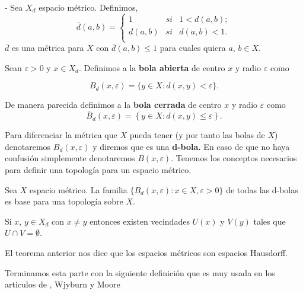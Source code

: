 \begin{ej}\label{ejem:metrica-acotada}
- Sea $X_{d}$ espacio métrico. Definimos,
$$\bar{d}(a,b)=\left\{
\begin{array}{lcc}
1 & si & 1 < d(a,b);   \\
d(a,b) & si & d(a,b)<1. \\
\end{array}
\right.
$$
$\bar{d}$ es una métrica para $X$ con $\bar{d}(a,b)\leq 1$ para cuales quiera $a$, $b \in X.$ 
\end{ej}

\label{def:top-espacios-metricos}
\begin{df}
Sean $\varepsilon > 0$ y $x\in X_d$. Definimos a la \textbf{bola abierta} de centro $x$ y radio $\varepsilon$  como

$$B_{d}(x,\varepsilon)=\{ y \in X: d(x,y)< \varepsilon \}.$$

De manera parecida definimos a la \textbf{bola cerrada} de centro $x$ y radio $\varepsilon$  como
$$\overline{B}_{d}(x,\varepsilon)=\left\lbrace y \in X: d(x,y)\leq \varepsilon \right\rbrace.$$
\end{df}

Para diferenciar la métrica que $X$ pueda tener (y por tanto las bolas de $X$) denotaremos $B_{d}(x,\varepsilon)$ y diremos que es una \textbf{d-bola.} En caso de que no haya confusión simplemente denotaremos $B(x,\varepsilon)$. Tenemos los conceptos necesarios para definir una topología para un espacio métrico.

\begin{pr}\label{prp:bolas-bse}
Sea $X$ espacio métrico. La familia $\lbrace B_{d}(x,\varepsilon): x \in X, \varepsilon > 0\rbrace$ de todas las d-bolas es base para una topología sobre $X$.
\end{pr}


\begin{te}
Si $x$, $y \in X_{d}$ con $ x\neq y $ entonces existen vecindades $U(x)$ y $V(y)$ tales que $U \cap V=\emptyset$.
\end{te}

\begin{ob}\label{obs:espacios-metricos-son-hausdorff}
El teorema anterior nos dice que los espacios métricos son espacios Hausdorff.
\end{ob}

Terminamos esta parte con la siguiente definición que es muy usada en los articulos de \cite{kras}, Wjyburn y Moore

